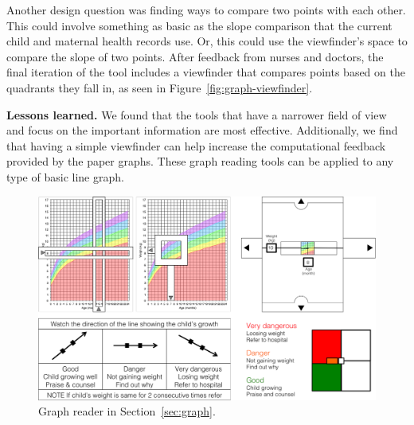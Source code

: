 \documentclass{sig-alternate}
\begin{document}
Another design question was finding ways to compare two points with each other. This could involve something as basic as the slope comparison that the current child and maternal health records use. Or, this could use the viewfinder's space to compare the slope of two points. After feedback from nurses and doctors, the final iteration of the tool includes a viewfinder that compares points based on the quadrants they fall in, as seen in Figure~\ref{fig:graph-viewfinder}.

\textbf{Lessons learned.}
We found that the tools that have a narrower field of view and focus on the important information are most effective. Additionally, we find that having a simple viewfinder can help increase the computational feedback provided by the paper graphs. 
These graph reading tools can be applied to any type of basic line graph. 


\begin{figure}
\centering
\includegraphics[width=\linewidth]{img/graph.png}
\caption{Graph reader in Section~\ref{sec:graph}.}
\label{fig:graph}
\end{figure}


\end{document}
